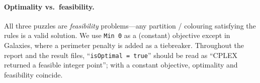 \paragraph{Optimality vs.\ feasibility.} All three puzzles are \emph{feasibility} problems---any partition / colouring satisfying the rules is a valid solution. We use \texttt{Min 0} as a (constant) objective except in Galaxies, where a perimeter penalty is added as a tiebreaker. Throughout the report and the result files, ``\texttt{isOptimal = true}'' should be read as ``CPLEX returned a feasible integer point''; with a constant objective, optimality and feasibility coincide.

